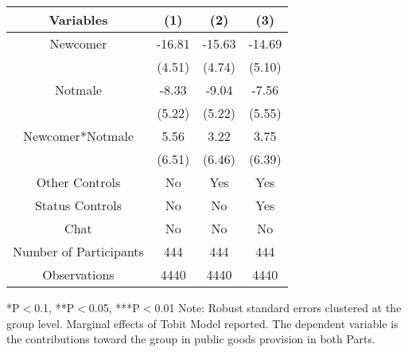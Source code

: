 \begin{table}[htbp]
    \begin{tabular}{c c c c}
    \toprule
    \textbf{Variables} & \textbf{(1)} & \textbf{(2)} & \textbf{(3)}      \\ 
\midrule
Newcomer                         &     -16.81\sym{***} &     -15.63\sym{***}  &  -14.69\sym{***}   \\
                                 &     (4.51)          &     (4.74)          &  (5.10)             \\
Notmale                         &        -8.33\sym{*} &     -9.04\sym{*}  &  -7.56     \\
                                 &     (5.22)          &     (5.22)          &  (5.55)             \\
Newcomer*Notmale                  &     5.56         &  3.22               &  3.75    \\
                                 &     (6.51)          &   (6.46)          &  (6.39)             \\


\midrule
Other Controls                   &    No               &    Yes              &    Yes            \\
Status Controls                    &    No               &    No               &    Yes           \\
Chat                             &    No               &    No               &    No             \\
\midrule
Number of Participants           &    444               &    444              &    444               \\
\midrule
Observations                     &       4440          &       4440          &  4440            \\
\bottomrule

\end{tabular}
\begin{footnotesize}
\newline
*P$<$0.1, **P$<$0.05, ***P$<$0.01
\newline
Note: Robust standard errors clustered at the group level. Marginal effects of Tobit Model reported.
\newline
The dependent variable is the contributions toward the group in public goods provision in both Parts.
\end{footnotesize}
\end{table}